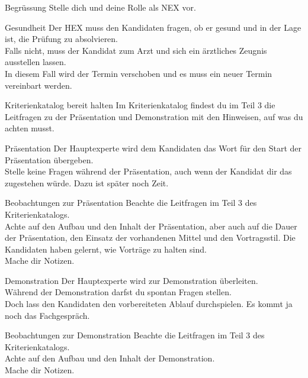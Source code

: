 \begin{taskitemwithoutcomment}{Begrüssung}
  Stelle dich und deine Rolle als NEX vor.\\
\end{taskitemwithoutcomment}  
\begin{taskitemwithoutcomment}{Gesundheit}
  Der HEX muss den Kandidaten fragen, ob er gesund und in der Lage ist, die Prüfung zu absolvieren.\\
  Falls nicht, muss der Kandidat zum Arzt und sich ein ärztliches Zeugnis ausstellen lassen.\\
  In diesem Fall wird der Termin verschoben und es muss ein neuer Termin vereinbart werden.
\end{taskitemwithoutcomment}
\begin{taskitemwithoutcomment}{Kriterienkatalog bereit halten}
  Im Kriterienkatalog findest du im Teil 3 die Leitfragen zu der Präsentation und Demonstration mit den Hinweisen, auf was du achten musst.
\end{taskitemwithoutcomment}
\begin{taskitemwithoutcomment}{Präsentation}
  Der Hauptexperte wird dem Kandidaten das Wort für den Start der Präsentation übergeben.\\
  Stelle keine Fragen während der Präsentation, auch wenn der Kandidat dir das zugestehen würde. Dazu ist später noch Zeit.
\end{taskitemwithoutcomment}
\begin{taskitem}{Beobachtungen zur Präsentation}
  Beachte die Leitfragen im Teil 3 des Kriterienkatalogs.\\
  Achte auf den Aufbau und den Inhalt der Präsentation, aber auch auf die Dauer der Präsentation, den Einsatz der vorhandenen Mittel und den Vortragsstil. Die Kandidaten haben gelernt, wie Vorträge zu halten sind.\\
  Mache dir Notizen.
\end{taskitem}
\begin{taskitemwithoutcomment}{Demonstration}
  Der Hauptexperte wird zur Demonstration überleiten.\\
  Während der Demonstration darfst du spontan Fragen stellen.\\
  Doch lass den Kandidaten den vorbereiteten Ablauf durchspielen. Es kommt ja noch das Fachgespräch. 
\end{taskitemwithoutcomment}
\begin{taskitem}{Beobachtungen zur Demonstration}
  Beachte die Leitfragen im Teil 3 des Kriterienkatalogs.\\
  Achte auf den Aufbau und den Inhalt der Demonstration.\\
  Mache dir Notizen.
\end{taskitem}
